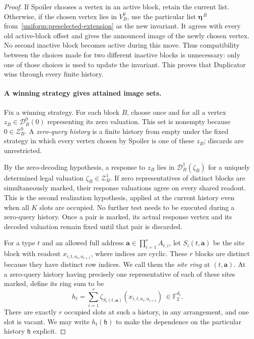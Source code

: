 \documentclass[11pt]{article}
\theoremstyle{definition}
\newcommand{\F}{\mathbb F_2}
\newcommand{\cZ}{\mathcal Z}
\begin{document}
\begin{proof}
If Spoiler chooses a vertex in an active block, retain the current list.
Otherwise, if the chosen vertex lies in $V_B^0$, use the particular list
$\boldsymbol\eta^{\,B}$ from~\eqref{uniform:preselected-extension} as the
new invariant.  It agrees with every old active-block offset and gives the
announced image of the newly chosen vertex.  No second inactive block
becomes active during this move.  Thus compatibility between the choices
made for two different inactive blocks is unnecessary: only one of those
choices is used to update the invariant.  This proves that Duplicator wins
through every finite history.

\paragraph{A winning strategy gives attained image sets.}
Fix a winning strategy.  For each block \(B\), choose once and for all a
vertex \(z_B\in\mathcal D_B^0(0)\) representing its zero valuation.
This set is nonempty because \(0\in\cZ_B^0\).  A
\emph{zero-query history} is a finite history from empty under the fixed
strategy in which every vertex chosen by Spoiler is one of these $z_B$;
discards are unrestricted.

By the zero-decoding hypothesis, a response to \(z_B\) lies in
\(\mathcal D_B^1(\zeta_B)\) for a uniquely determined legal valuation
$\zeta_B\in\cZ_B^1$.  If zero representatives of distinct blocks are
simultaneously marked, their response valuations agree on every shared
readout. This is the second realization hypothesis, applied at the
current history even when all $K$ slots are occupied. No further test
needs to be executed during a zero-query history. Once a pair is marked,
its actual response vertex and its decoded valuation remain fixed until
that pair is discarded.

For a type $t$ and an allowed full address
$\mathbf a\in\prod_{i=1}^r A_{t,i}$, let
$S_i(t,\mathbf a)$ be the site block with readout
$x_{i,t,a_i,a_{i+1}}$, where indices are cyclic.  These $r$ blocks are
distinct because they have distinct row indices.  We call them the
\emph{site ring} at $(t,\mathbf a)$.  At a zero-query history having
precisely one representative of each of these sites marked, define its
ring sum to be
\begin{equation}
\label{uniform:ring-sum}
 h_t=\sum_{i=1}^r
 \zeta_{S_i(t,\mathbf a)}(x_{i,t,a_i,a_{i+1}})
 \ \in\F^{d_t}.
\end{equation}
There are exactly $r$ occupied slots at such a history, in any arrangement,
and one slot is vacant.  We may write $h_t(\mathfrak h)$ to make the
dependence on the particular history $\mathfrak h$ explicit.


\end{proof}
\end{document}
